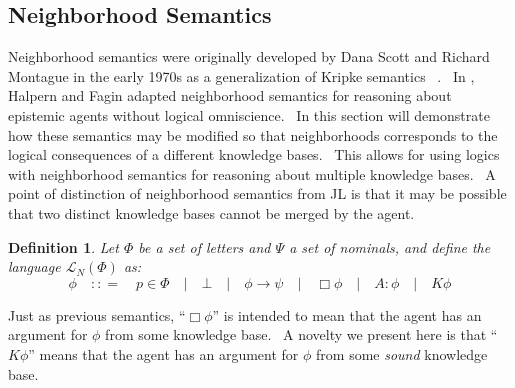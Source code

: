\documentclass{acmconf}
\newcommand{\tmtextit}[1]{{\itshape{#1}}}
\newtheorem{definition}{Definition}
\begin{document}
\subsection{Neighborhood Semantics}

Neighborhood semantics were originally developed by Dana Scott and Richard
Montague in the early 1970s as a generalization of Kripke semantics \
{\cite{montague_universal_2008,scott_advice_1970}}. \ In
{\cite{fagin_belief_1988}}, Halpern and Fagin adapted neighborhood semantics
for reasoning about epistemic agents without logical omniscience. \ In this
section will demonstrate how these semantics may be modified so that
neighborhoods corresponds to the logical consequences of a different knowledge
bases. \ This allows for using logics with neighborhood semantics for
reasoning about multiple knowledge bases. \ A point of distinction of
neighborhood semantics from JL is that it may be possible that two distinct
knowledge bases cannot be merged by the agent.

\begin{definition}
  Let $\Phi$ be a set of letters and $\Psi$ a set of nominals, and define the
  language $\mathcal{L}_N (\Phi)$ as:
  \[ \phi \hspace{1em} : : = \hspace{1em} p \in \Phi \hspace{1em} |
     \hspace{1em} \bot \hspace{1em} | \hspace{1em} \phi \rightarrow \psi
     \hspace{1em} | \hspace{1em} \Box \phi \hspace{1em} | \hspace{1em} A :
     \phi \hspace{1em} | \hspace{1em} K \phi \]
\end{definition}

Just as previous semantics, ``$\Box \phi$'' is intended to mean that the agent
has an argument for $\phi$ from some knowledge base. \ A novelty we present
here is that ``$K \phi$'' means that the agent has an argument for $\phi$ from
some \tmtextit{sound} knowledge base.
\end{document}
